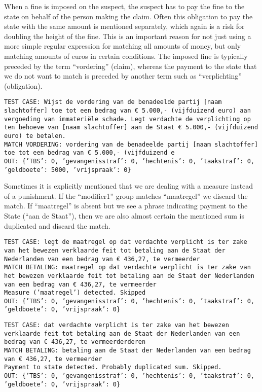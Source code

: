 \documentclass[a4paper]{article}
\begin{document}
When a fine is imposed on the suspect, the suspect has to pay the fine to the state on behalf of the person making the claim.
Often this obligation to pay the state with the same amount is mentioned separately, which again is a risk for doubling the height of the fine.
This is an important reason for not just using a more simple regular expression for matching all amounts of money, but only matching amounts of euros in certain conditions.
The imposed fine is typically preceded by the term ``vordering'' (claim), whereas the payment to the state that we do not want to match is preceded by another term such as ``verplichting'' (obligation).

\texttt{TEST CASE: %
Wijst de vordering van de benadeelde partij [naam slachtoffer] toe tot een bedrag van € 5.000,- (vijfduizend euro) aan vergoeding van immateriële schade. Legt verdachte de verplichting op ten behoeve van [naam slachtoffer] aan de Staat € 5.000,- (vijfduizend euro) te betalen.\\
MATCH VORDERING: vordering van de benadeelde partij [naam slachtoffer] toe tot een bedrag van € 5.000,- (vijfduizend e\\
OUT: \{'TBS': 0, 'gevangenisstraf': 0, 'hechtenis': 0, 'taakstraf': 0, 'geldboete': 5000, 'vrijspraak': 0\}}


Sometimes it is explicitly mentioned that we are dealing with a measure instead of a punishment.
If the ``modifier1'' group matches ``maatregel'' we discard the match.
If ``maatregel'' is absent but we see a phrase indicating payment to the State (``aan de Staat''), then we are also almost certain the mentioned sum is duplicated and discard the match.

\texttt{TEST CASE: %
legt de maatregel op dat verdachte verplicht is ter zake van het bewezen verklaarde feit tot betaling aan de Staat der Nederlanden van een bedrag van € 436,27, te vermeerder\\
MATCH BETALING: maatregel op dat verdachte verplicht is ter zake van het bewezen verklaarde feit tot betaling aan de Staat der Nederlanden van een bedrag van € 436,27, te vermeerder\\
Measure ('maatregel') detected. Skipped\\
OUT: \{'TBS': 0, 'gevangenisstraf': 0, 'hechtenis': 0, 'taakstraf': 0, 'geldboete': 0, 'vrijspraak': 0\}}

\texttt{TEST CASE: %
dat verdachte verplicht is ter zake van het bewezen verklaarde feit tot betaling aan de Staat der Nederlanden van een bedrag van € 436,27, te vermeerderderen\\
MATCH BETALING: betaling aan de Staat der Nederlanden van een bedrag van € 436,27, te vermeerder\\
Payment to state detected. Probably duplicated sum. Skipped.\\
OUT: \{'TBS': 0, 'gevangenisstraf': 0, 'hechtenis': 0, 'taakstraf': 0, 'geldboete': 0, 'vrijspraak': 0\}}
\end{document}
